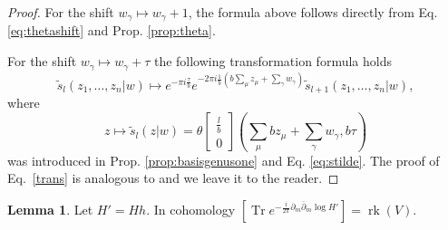 \documentclass{article}
\theoremstyle{definition}
\newcounter{sharedcounter}[section]
\newtheorem{lemma}[sharedcounter]{Lemma}
\DeclareMathOperator{\rk}{rk}
\DeclareMathOperator{\tr}{Tr}
\newcommand{\chara}[2]{\begin{bmatrix} #1 \\ #2 \end{bmatrix}}
\newcommand{\ov}[1]{\overline{#1}}
\begin{document}
\begin{proof}
For the shift $w_\gamma \mapsto w_\gamma+1$, the formula above follows directly from Eq. \eqref{eq:thetashift} and Prop. \ref{prop:theta}. 

For the shift $w_\gamma \mapsto w_\gamma+\tau$  the following transformation  formula holds
\begin{equation}\label{trans}
\tilde{s}_{l}(z_1,\dots,z_n|w) \mapsto e^{-\pi i \frac{\tau}{b}} e^{-2\pi i \frac{1}{b}\left(b\sum_\mu z_\mu + \sum_\gamma w_\gamma\right)} \tilde{s}_{l+1}(z_1,\dots,z_n|w),
\end{equation}
where
$$z \mapsto \tilde{s}_{l}(z|w)=\theta \chara{\frac{l}{b}}{0} \left(\sum_\mu b z_\mu + \sum_\gamma w_\gamma,b\tau\right)$$
was introduced in Prop. \ref{prop:basisgenusone} and Eq. \eqref{eq:stilde}. 
The proof of Eq.\ \eqref{trans} is analogous to \cite[Lem. 2.9]{Burban_Klevtsov_2025} and we leave it to the reader.
\end{proof}

\begin{lemma}
  Let $H'=Hh$. In cohomology $[\tr e^{-\frac{i}{2\pi}\partial_m \ov{\partial}_m \log H'}]=\rk(V)$.
\end{lemma}
\end{document}

